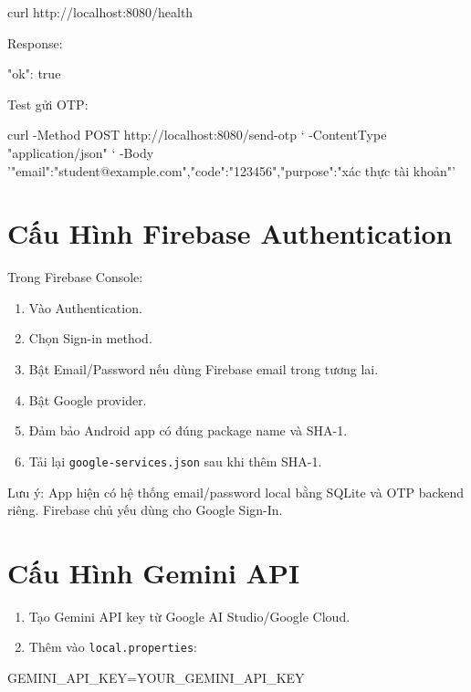 \documentclass[12pt,a4paper]{report}
\begin{document}
\begin{CodeBlock}
curl http://localhost:8080/health
\end{CodeBlock}

Response:

\begin{CodeBlock}
{"ok": true}
\end{CodeBlock}

Test gửi OTP:

\begin{CodeBlock}
curl -Method POST http://localhost:8080/send-otp `
  -ContentType "application/json" `
  -Body '{"email":"student@example.com","code":"123456","purpose":"xác thực tài khoản"}'
\end{CodeBlock}

\section{Cấu Hình Firebase Authentication}

Trong Firebase Console:

\begin{enumerate}
\item Vào Authentication.
\item Chọn Sign-in method.
\item Bật Email/Password nếu dùng Firebase email trong tương lai.
\item Bật Google provider.
\item Đảm bảo Android app có đúng package name và SHA-1.
\item Tải lại \texttt{google-services.json} sau khi thêm SHA-1.
\end{enumerate}

Lưu ý: App hiện có hệ thống email/password local bằng SQLite và OTP backend riêng. Firebase chủ yếu dùng cho Google Sign-In.

\section{Cấu Hình Gemini API}

\begin{enumerate}
\item Tạo Gemini API key từ Google AI Studio/Google Cloud.
\item Thêm vào \texttt{local.properties}:
\end{enumerate}

\begin{CodeBlock}
GEMINI_API_KEY=YOUR_GEMINI_API_KEY
\end{CodeBlock}
\end{document}
